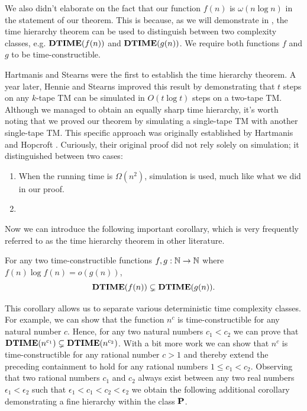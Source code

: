 \begin{remark}
  We also didn't elaborate on the fact that our function $f(n)$ is $\omega(n \log n)$ in the statement of our theorem. This is because, as we will demonstrate in , the time hierarchy theorem can be used to distinguish between two complexity classes, e.g. $\textbf{DTIME}(f(n))$ and $\textbf{DTIME}(g(n))$. We require both functions $f$ and $g$ to be time-constructible.
\end{remark}

\begin{remark}
  Hartmanis and Stearns \cite{hartmanis1965computational} were the first to establish the time hierarchy theorem. A year later, Hennie and Stearns \cite{hennie1966two} improved this result by demonstrating that $t$ steps on any $k$-tape TM can be simulated in $O(t \log t)$ steps on a two-tape TM. Although we managed to obtain an equally sharp time hierarchy, it's worth noting that we proved our theorem by simulating a single-tape TM with another single-tape TM. This specific approach was originally established by Hartmanis and Hopcroft \cite{hartmanis1968computational}. Curiously, their original proof did not rely solely on simulation; it distinguished between two cases:
  \begin{enumerate}
    \item When the running time is $\Omega(n^2)$, simulation is used, much like what we did in our proof.
    \item {}
  \end{enumerate}
\end{remark}

Now we can introduce the following important corollary, which is very frequently referred to as the time hierarchy theorem in other literature.

\begin{corollary}
  For any two time-constructible functions $f, g : \mathbb N \to \mathbb N$ where $f(n) \log f(n) = o(g(n))$,
  \[ \textbf{DTIME}(f(n)) \subsetneq \textbf{DTIME}(g(n)). \]
\end{corollary}

This corollary allows us to separate various deterministic time complexity classes. For example, we can show that the function $n^c$ is time-constructible for any natural number $c$. Hence, for any two natural numbers $c_1 < c_2$ we can prove that $\textbf{DTIME}(n^{c_1}) \subsetneq \textbf{DTIME}(n^{c_2})$. With a bit more work we can show that $n^c$ is time-constructible for any rational number $c > 1$ and thereby extend the preceding containment to hold for any rational numbers $1 \leq c_1 < c_2$. Observing that two rational numbers $c_1$ and $c_2$ always exist between any two real numbers $\epsilon_1 < \epsilon_2$ such that $\epsilon_1 < c_1 < c_2 < \epsilon_2$ we obtain the following additional corollary demonstrating a fine hierarchy within the class $\textbf{P}$.

